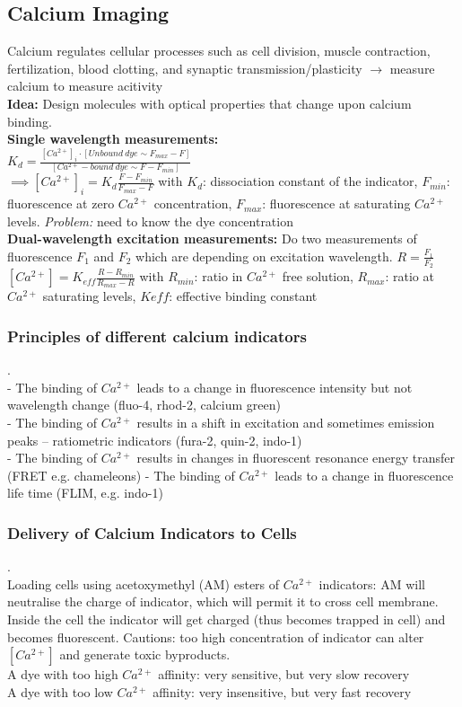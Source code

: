 \documentclass[9pt]{article}
\begin{document}
\begin{multicols}{2}
\subsection{Calcium Imaging}
Calcium regulates cellular processes such as cell
division, muscle contraction, fertilization, blood
clotting, and synaptic transmission/plasticity $\rightarrow$ measure calcium to measure acitivity\\
\textbf{Idea:} Design molecules with optical properties that change upon calcium binding.\\
\textbf{Single wavelength measurements: }\\
$K_d=\frac{[Ca^{2+}]_i\cdot [Unbound\ dye \sim F_{max}-F]}{[Ca^{2+}-bound\ dye \sim F-F_{min}]}$\\
$\implies [Ca^{2+}]_i =K_d\frac{F-F_{min}}{F_{max}-F}$ with $K_d$: dissociation constant of the indicator, $F_{min}$: fluorescence at zero $Ca^{2+}$ concentration, $F_{max}$: fluorescence at saturating $Ca^{2+}$ levels. \emph{Problem:} need to know the dye concentration\\
\textbf{Dual-wavelength excitation measurements: } Do two measurements of fluorescence $F_1$ and $F_2$ which are depending on excitation wavelength. $R=\frac{F_1}{F_2}$\\
$[Ca^{2+}]=K_{eff} \frac{R-R_{min}}{R_{max}-R}$ with $R_{min}$: ratio in $Ca^{2+}$ free solution, $R_{max}$: ratio at $Ca^{2+}$ saturating levels, $K{eff}$: effective binding constant
\subsubsection{Principles of different calcium indicators}.\\
- The binding of  $Ca^{2+}$ leads to a change in fluorescence intensity but not
wavelength change (fluo-4, rhod-2, calcium green)\\
- The binding of $Ca^{2+}$ results in a shift in excitation and sometimes emission
peaks – ratiometric indicators (fura-2, quin-2, indo-1)\\
- The binding of $Ca^{2+}$ results in changes in fluorescent resonance energy
transfer (FRET e.g. chameleons)
- The binding of $Ca^{2+}$ leads to a change in fluorescence life time (FLIM, e.g.
indo-1)
\subsubsection{Delivery of Calcium Indicators to Cells}.\\
Loading cells using acetoxymethyl (AM) esters of $Ca^{2+}$ indicators: AM will neutralise the charge of indicator, which will permit it to cross cell membrane. Inside the cell the indicator will get charged (thus becomes trapped in cell) and becomes fluorescent. Cautions: too high concentration of indicator can alter $[Ca^{2+}]$ and generate toxic byproducts.\\
A dye with too high $Ca^{2+}$ affinity: very sensitive, but very slow recovery\\
A dye with too low $Ca^{2+}$ affinity: very insensitive, but very fast recovery

\end{multicols}
\end{document}
